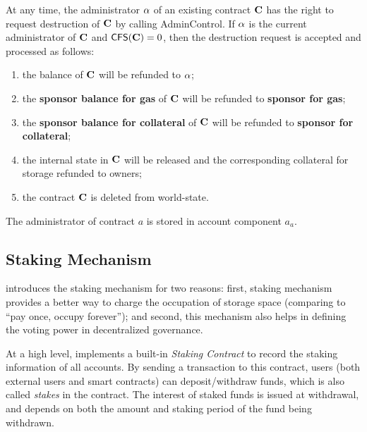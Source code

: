 At any time, the administrator $\mathbf{\alpha}$ of an existing contract $\mathbf{C}$ has the right to request destruction of $\mathbf{C}$ by calling AdminControl.
If $\mathbf{\alpha}$ is the current administrator of $\mathbf{C}$ and $\mathsf{CFS}(\mathbf{C})=0$, then the destruction request is accepted and processed as follows:
\begin{enumerate}[nosep]
 	\item the balance of $\mathbf{C}$ will be refunded to $\mathbf{\alpha}$; 

	\item the \textbf{sponsor balance for gas} of $\mathbf{C}$ will be refunded to \textbf{sponsor for gas};

	\item the \textbf{sponsor balance for collateral} of $\mathbf{C}$ will be refunded to \textbf{sponsor for collateral};

	\item the internal state in $\mathbf{C}$ will be released and the corresponding collateral for storage refunded to owners;

	\item the contract $\mathbf{C}$ is deleted from world-state.
\end{enumerate} 

The administrator of contract $a$ is stored in account component $a_a$. 

\subsection{Staking Mechanism}
\label{sec:staking}

\name introduces the staking mechanism for two reasons:
first, staking mechanism provides a better way to charge the occupation of storage space (comparing to ``pay once, occupy forever'');
and second, this mechanism also helps in defining the voting power in decentralized governance.

At a high level, \name implements a built-in \emph{Staking Contract} 
to record the staking information of all accounts.
By sending a transaction to this contract, 
users (both external users and smart contracts) can deposit/withdraw funds, which is also called \emph{stakes} in the contract.
The interest of staked funds is issued at withdrawal, 
and depends on both the amount and staking period of the fund being withdrawn. 



